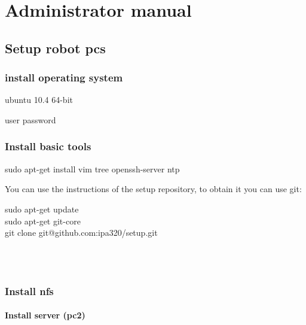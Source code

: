 \chapter{Administrator manual}   

\section{Setup robot pcs}

\subsection{install operating system}
ubuntu 10.4 64-bit

user password


\subsection{Install basic tools}
  \colorbox{light-gray}{
         \begin{minipage}{1.0\textwidth} 
	sudo apt-get install vim tree openssh-server ntp
         \end{minipage} }


You can use the instructions of the setup repository, to obtain it you can use git: 
\\
 \colorbox{light-gray} {
         \begin{minipage}{1.0\textwidth} 
  	sudo apt-get update \\ 
	sudo apt-get git-core \\
	git clone git@github.com:ipa320/setup.git
         \end{minipage} 
         }  \\
\\
\subsection{Install nfs}

\subsubsection{Install server (pc2)}

